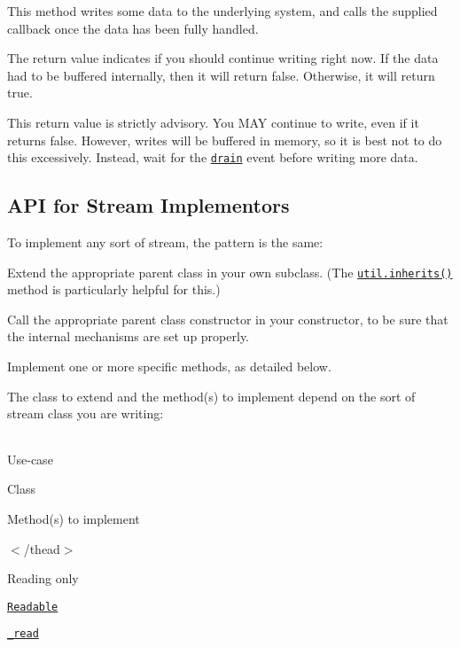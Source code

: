 This method writes some data to the underlying system, and calls the supplied callback once the data has been fully handled.

The return value indicates if you should continue writing right now. If the data had to be buffered internally, then it will return {\ttfamily false}. Otherwise, it will return {\ttfamily true}.

This return value is strictly advisory. You M\+AY continue to write, even if it returns {\ttfamily false}. However, writes will be buffered in memory, so it is best not to do this excessively. Instead, wait for the \href{#stream_event_drain}{\tt {\ttfamily \textquotesingle{}drain\textquotesingle{}}} event before writing more data.

\subsection*{A\+PI for Stream Implementors}

To implement any sort of stream, the pattern is the same\+:


\begin{DoxyEnumerate}
\item Extend the appropriate parent class in your own subclass. (The \href{https://nodejs.org/docs/v5.8.0/api/util.html#util_util_inherits_constructor_superconstructor}{\tt {\ttfamily util.\+inherits()}} method is particularly helpful for this.)
\item Call the appropriate parent class constructor in your constructor, to be sure that the internal mechanisms are set up properly.
\item Implement one or more specific methods, as detailed below.
\end{DoxyEnumerate}

The class to extend and the method(s) to implement depend on the sort of stream class you are writing\+:

\tabulinesep=1mm
\begin{longtabu} spread 0pt [c]{*{0}{|X[-1]}|}
\hline
\end{longtabu}


Use-\/case

Class

Method(s) to implement

$<$/thead$>$ 

Reading only

\href{#stream_class_stream_readable_1}{\tt Readable}

{\ttfamily \href{#stream_readable_read_size_1}{\tt \+\_\+read}}


